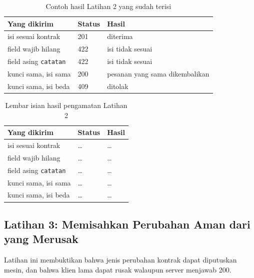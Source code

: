 \begin{table}[!htb]
  \centering
  \caption{Contoh hasil Latihan 2 yang sudah terisi}
  \label{tab:c12-lat2-contoh}
  \begin{tabularx}{\textwidth}{Xll}
    \hline
    \textbf{Yang dikirim} & \textbf{Status} & \textbf{Hasil} \\
    \hline
    isi sesuai kontrak & 201 & diterima \\
    \hline
    field wajib hilang & 422 & isi tidak sesuai \\
    \hline
    field asing \texttt{catatan} & 422 & isi tidak sesuai \\
    \hline
    kunci sama, isi sama & 200 & pesanan yang sama dikembalikan \\
    \hline
    kunci sama, isi beda & 409 & ditolak \\
    \hline
  \end{tabularx}
\end{table}

\begin{table}[!htb]
  \centering
  \caption{Lembar isian hasil pengamatan Latihan 2}
  \label{tab:c12-lat2-hasil}
  \begin{tabularx}{\textwidth}{Xll}
    \hline
    \textbf{Yang dikirim} & \textbf{Status} & \textbf{Hasil} \\
    \hline
    isi sesuai kontrak & \dots & \dots \\
    \hline
    field wajib hilang & \dots & \dots \\
    \hline
    field asing \texttt{catatan} & \dots & \dots \\
    \hline
    kunci sama, isi sama & \dots & \dots \\
    \hline
    kunci sama, isi beda & \dots & \dots \\
    \hline
  \end{tabularx}
\end{table}

\subsection*{Latihan 3: Memisahkan Perubahan Aman dari yang Merusak}

Latihan ini membuktikan bahwa jenis perubahan kontrak dapat diputuskan mesin,
dan bahwa klien lama dapat rusak walaupun server menjawab 200.

